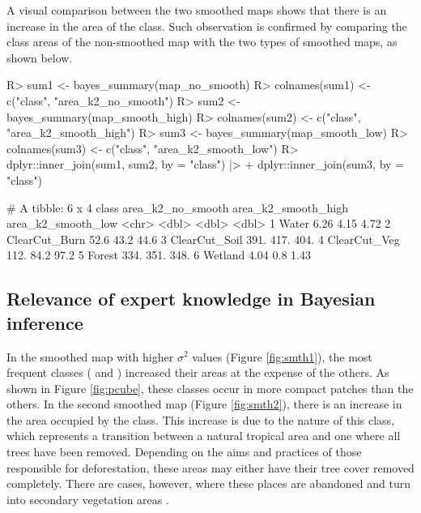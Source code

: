 \documentclass[
  shortnames]{jss}
\begin{document}
A visual comparison between the two smoothed maps shows that there is an increase in the area of the  class. Such observation is confirmed by comparing the class areas of the non-smoothed map with the two types of smoothed maps, as shown below.

\begin{CodeChunk}
\begin{CodeInput}
R> sum1 <- bayes_summary(map_no_smooth)
R> colnames(sum1) <- c("class", "area_k2_no_smooth")
R> sum2 <- bayes_summary(map_smooth_high)
R> colnames(sum2) <- c("class", "area_k2_smooth_high")
R> sum3 <- bayes_summary(map_smooth_low)
R> colnames(sum3) <- c("class", "area_k2_smooth_low")
R> dplyr::inner_join(sum1, sum2, by = "class") |>  
+   dplyr::inner_join(sum3, by = "class")
\end{CodeInput}
\begin{CodeOutput}
# A tibble: 6 x 4
  class         area_k2_no_smooth area_k2_smooth_high area_k2_smooth_low
  <chr>                     <dbl>               <dbl>              <dbl>
1 Water                      6.26                4.15               4.72
2 ClearCut_Burn             52.6                43.2               44.6 
3 ClearCut_Soil            391.                417.               404.  
4 ClearCut_Veg             112.                 84.2               97.2 
5 Forest                   334.                351.               348.  
6 Wetland                    4.04                0.8                1.43
\end{CodeOutput}
\end{CodeChunk}

\hypertarget{relevance-of-expert-knowledge-in-bayesian-inference}{%
\subsection{Relevance of expert knowledge in Bayesian inference}\label{relevance-of-expert-knowledge-in-bayesian-inference}}

In the smoothed map with higher \(\sigma^2\) values (Figure \ref{fig:smth1}), the most frequent classes ( and ) increased their areas at the expense of the others. As shown in Figure \ref{fig:pcube}, these classes occur in more compact patches than the others. In the second smoothed map (Figure \ref{fig:smth2}), there is an increase in the area occupied by the  class. This increase is due to the nature of this class, which represents a transition between a natural tropical area and one where all trees have been removed. Depending on the aims and practices of those responsible for deforestation, these areas may either have their tree cover removed completely. There are cases, however, where these places are abandoned and turn into secondary vegetation areas \cite{Uhl1988, Wang2020}.
\end{document}
